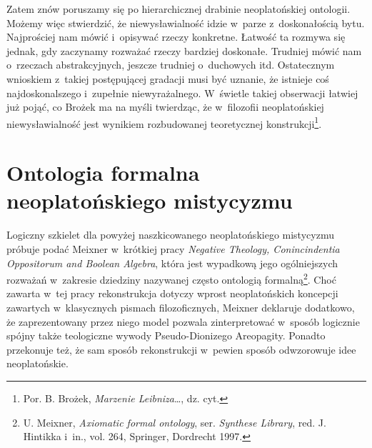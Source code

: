 Zatem znów poruszamy się po hierarchicznej drabinie neoplatońskiej ontologii. Możemy więc stwierdzić, że niewysławialność idzie w~parze z~doskonałością bytu. Najprościej nam mówić i~opisywać rzeczy konkretne. Łatwość ta rozmywa się jednak, gdy zaczynamy rozważać rzeczy bardziej doskonałe. Trudniej mówić nam o~rzeczach abstrakcyjnych, jeszcze trudniej o~duchowych itd. Ostatecznym wnioskiem z~takiej postępującej gradacji musi być uznanie, że istnieje coś najdoskonalszego i~zupełnie niewyrażalnego. W~świetle takiej obserwacji łatwiej już pojąć, co Brożek ma na myśli twierdząc, że w~filozofii neoplatońskiej niewysławialność jest wynikiem rozbudowanej teoretycznej konstrukcji\footnote{Por. B. Brożek, \textit{Marzenie Leibniza}\ldots, dz. cyt.}.




\chapter{Ontologia formalna neoplatońskiego mistycyzmu}

Logiczny szkielet dla powyżej naszkicowanego neoplatońskiego mistycyzmu próbuje podać Meixner w~krótkiej pracy \textit{Negative Theology, Conincindentia Oppositorum and Boolean Algebra}, która jest wypadkową jego ogólniejszych rozważań w~zakresie dziedziny nazywanej często ontologią formalną\footnote{U. Meixner, \textit{Axiomatic formal ontology}, ser. \textit{Synthese Library}, red. J. Hintikka i~in., vol. 264, Springer, Dordrecht 1997.}. Choć zawarta w~tej pracy rekonstrukcja dotyczy wprost neoplatońskich koncepcji zawartych w~klasycznych pismach filozoficznych, Mei\-xner deklaruje dodatkowo, że zaprezentowany przez niego model pozwala zinterpretować w~sposób logicznie spójny także teologiczne wywody Pseudo-Dionizego Areopagity. Ponadto przekonuje też, że sam sposób rekonstrukcji w~pewien sposób odwzorowuje idee neoplatońskie.

